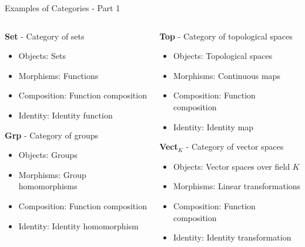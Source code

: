 \documentclass{beamer}
\begin{document}
\begin{frame}{Examples of Categories - Part 1}
    \begin{columns}
        \begin{column}{0.5\textwidth}
            \textbf{Set} - Category of sets
            \begin{itemize}
                \item Objects: Sets
                \item Morphisms: Functions
                \item Composition: Function composition
                \item Identity: Identity function
            \end{itemize}
            
            \vspace{0.3cm}
            \textbf{Grp} - Category of groups
            \begin{itemize}
                \item Objects: Groups
                \item Morphisms: Group homomorphisms
                \item Composition: Function composition
                \item Identity: Identity homomorphism
            \end{itemize}
        \end{column}
        \begin{column}{0.5\textwidth}
            \textbf{Top} - Category of topological spaces
            \begin{itemize}
                \item Objects: Topological spaces
                \item Morphisms: Continuous maps
                \item Composition: Function composition
                \item Identity: Identity map
            \end{itemize}
            
            \vspace{0.3cm}
            \textbf{Vect$_K$} - Category of vector spaces
            \begin{itemize}
                \item Objects: Vector spaces over field $K$
                \item Morphisms: Linear transformations
                \item Composition: Function composition
                \item Identity: Identity transformation
            \end{itemize}
        \end{column}
    \end{columns}
\end{frame}
\end{document}
